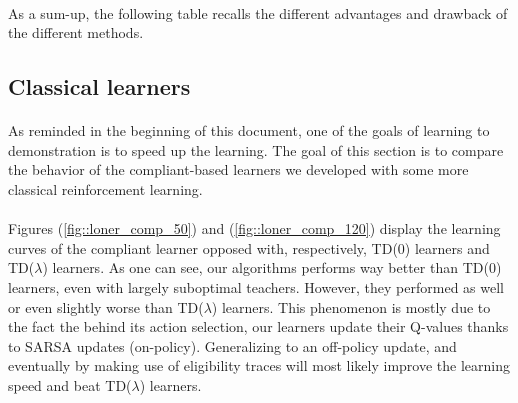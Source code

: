 \documentclass[a4paper]{report}
\begin{document}
{{{			\paragraph{} As a sum-up, the following table recalls the different advantages and drawback of the different methods. 
		}
		\subsection{Classical learners}
		{
			\paragraph{} As reminded in the beginning of this document, one of the goals of learning to demonstration is to speed up the learning. The goal of this section is to compare the behavior of the compliant-based learners we developed with some more classical reinforcement learning. 
			
			\paragraph{} Figures (\ref{fig::loner_comp_50}) and (\ref{fig::loner_comp_120}) display the learning curves of the compliant learner opposed with, respectively, TD(0) learners and TD($\lambda$) learners. As one can see, our algorithms performs way better than TD(0) learners, even with largely suboptimal teachers. However, they performed as well or even slightly worse than TD($\lambda$) learners. This phenomenon is mostly due to the fact the behind its action selection, our learners update their Q-values thanks to SARSA updates (on-policy). Generalizing to an off-policy update, and eventually by making use of eligibility traces will most likely improve the learning speed and beat TD($\lambda$) learners. 
							
}}}
\end{document}
